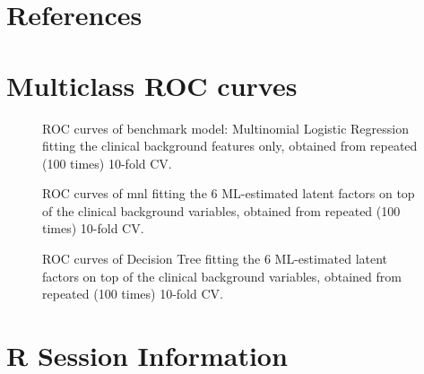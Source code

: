 \documentclass{amsart}
\begin{document}
\newpage
\section*{References}
\printbibliography[heading=none]
\clearpage
\appendix 
\clearpage
\section{Multiclass ROC curves} \label{appendixA}
\begin{figure}[htb]
  
  \caption{ROC curves of benchmark model: Multinomial Logistic Regression fitting the clinical background features only, obtained from repeated (100 times) 10-fold CV.}
  \label{roc:bench}
\end{figure}
\begin{figure}[!h]

\caption{ROC curves of \acrlong*{mnl} fitting the 6 ML-estimated latent factors on top of the clinical background variables, obtained from repeated (100 times) 10-fold CV.}
\label{roc:mlr6}
\end{figure}

\begin{figure}[htb]

\caption{ROC curves of Decision Tree fitting the 6 ML-estimated latent factors on top of the clinical background variables, obtained from repeated (100 times) 10-fold CV.}
\label{roc:tree}
\end{figure}

\clearpage  
\section{R Session Information} \label{appendixB}
\end{document}
